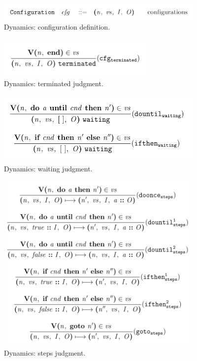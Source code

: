 \documentclass{sig-alternate-05-2015}
\begin{document}
\begin{figure}
\centering
\includegraphics[height=0.35in, width=4in]{images/configuration.png}
\caption{Dynamics: configuration definition.}
\end{figure}

\begin{figure}
\centering
\includegraphics[height=0.8in, width=3in]{images/terminated.png}
\caption{Dynamics: terminated judgment.}
\end{figure}

\begin{figure}
\centering
\includegraphics[height=1.4in, width=4in]{images/waiting.png}
\caption{Dynamics: waiting judgment.}
\end{figure}

\begin{figure}
\centering
\includegraphics[height=3.5in, width=4in]{images/steps.png}
\caption{Dynamics: steps judgment.}
\end{figure}
\end{document}
